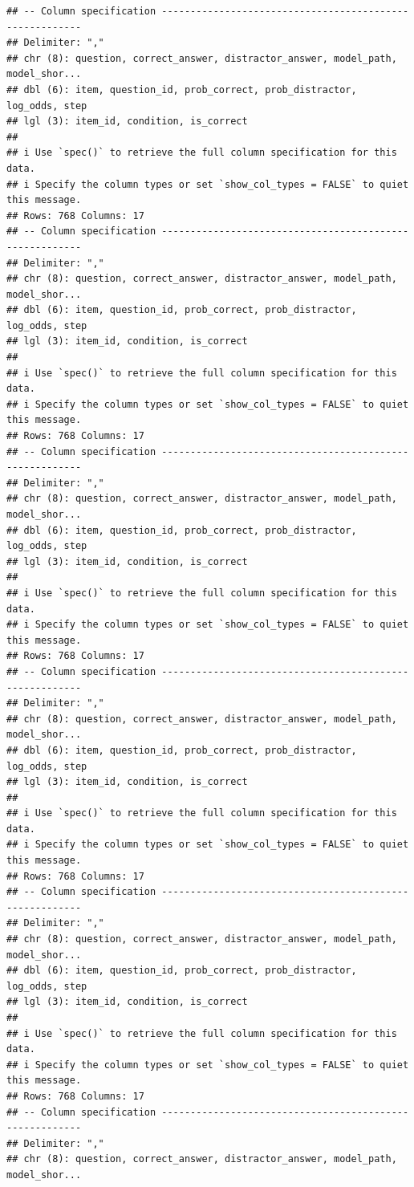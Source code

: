 \documentclass[
]{article}
\begin{document}
\begin{verbatim}
## -- Column specification --------------------------------------------------------
## Delimiter: ","
## chr (8): question, correct_answer, distractor_answer, model_path, model_shor...
## dbl (6): item, question_id, prob_correct, prob_distractor, log_odds, step
## lgl (3): item_id, condition, is_correct
## 
## i Use `spec()` to retrieve the full column specification for this data.
## i Specify the column types or set `show_col_types = FALSE` to quiet this message.
## Rows: 768 Columns: 17
## -- Column specification --------------------------------------------------------
## Delimiter: ","
## chr (8): question, correct_answer, distractor_answer, model_path, model_shor...
## dbl (6): item, question_id, prob_correct, prob_distractor, log_odds, step
## lgl (3): item_id, condition, is_correct
## 
## i Use `spec()` to retrieve the full column specification for this data.
## i Specify the column types or set `show_col_types = FALSE` to quiet this message.
## Rows: 768 Columns: 17
## -- Column specification --------------------------------------------------------
## Delimiter: ","
## chr (8): question, correct_answer, distractor_answer, model_path, model_shor...
## dbl (6): item, question_id, prob_correct, prob_distractor, log_odds, step
## lgl (3): item_id, condition, is_correct
## 
## i Use `spec()` to retrieve the full column specification for this data.
## i Specify the column types or set `show_col_types = FALSE` to quiet this message.
## Rows: 768 Columns: 17
## -- Column specification --------------------------------------------------------
## Delimiter: ","
## chr (8): question, correct_answer, distractor_answer, model_path, model_shor...
## dbl (6): item, question_id, prob_correct, prob_distractor, log_odds, step
## lgl (3): item_id, condition, is_correct
## 
## i Use `spec()` to retrieve the full column specification for this data.
## i Specify the column types or set `show_col_types = FALSE` to quiet this message.
## Rows: 768 Columns: 17
## -- Column specification --------------------------------------------------------
## Delimiter: ","
## chr (8): question, correct_answer, distractor_answer, model_path, model_shor...
## dbl (6): item, question_id, prob_correct, prob_distractor, log_odds, step
## lgl (3): item_id, condition, is_correct
## 
## i Use `spec()` to retrieve the full column specification for this data.
## i Specify the column types or set `show_col_types = FALSE` to quiet this message.
## Rows: 768 Columns: 17
## -- Column specification --------------------------------------------------------
## Delimiter: ","
## chr (8): question, correct_answer, distractor_answer, model_path, model_shor...

\end{verbatim}
\end{document}
